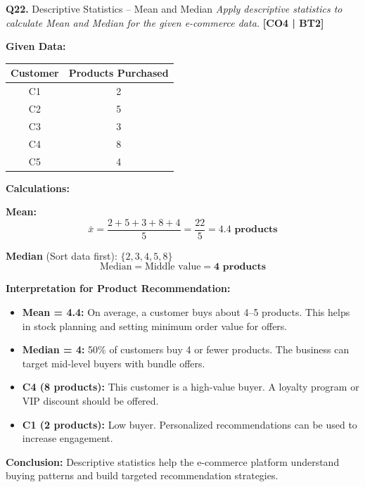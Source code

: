 \documentclass[12pt,a4paper]{article}
\newcommand{\Qno}[1]{\textbf{\color{darkred}Q#1.}}
\newcommand{\term}[1]{\textbf{\color{headingcolor}#1}}
\begin{document}
\vspace{8pt}

\begin{questionbox}{\Qno{22} Descriptive Statistics -- Mean and Median}
\textit{Apply descriptive statistics to calculate Mean and Median for the given e-commerce data.} \hfill \textbf{[CO4 | BT2]}
\end{questionbox}

\begin{answerenv}

\textbf{\color{headingcolor}Given Data:}
\begin{center}
\begin{tabular}{cc}
\toprule
\textbf{Customer} & \textbf{Products Purchased} \\
\midrule
C1 & 2 \\
C2 & 5 \\
C3 & 3 \\
C4 & 8 \\
C5 & 4 \\
\bottomrule
\end{tabular}
\end{center}

\textbf{\color{headingcolor}Calculations:}

\textbf{Mean:}
\[
\bar{x} = \frac{2 + 5 + 3 + 8 + 4}{5} = \frac{22}{5} = \mathbf{4.4 \text{ products}}
\]

\textbf{Median} (Sort data first): $\{2, 3, 4, 5, 8\}$
\[
\text{Median} = \text{Middle value} = \mathbf{4 \text{ products}}
\]

\textbf{\color{headingcolor}Interpretation for Product Recommendation:}
\begin{itemize}[leftmargin=1.5em, itemsep=3pt]
  \item \term{Mean = 4.4:} On average, a customer buys about 4--5 products. This helps in stock planning and setting minimum order value for offers.
  \item \term{Median = 4:} 50\% of customers buy 4 or fewer products. The business can target mid-level buyers with bundle offers.
  \item \term{C4 (8 products):} This customer is a high-value buyer. A loyalty program or VIP discount should be offered.
  \item \term{C1 (2 products):} Low buyer. Personalized recommendations can be used to increase engagement.
\end{itemize}

\begin{keypoint}
\textbf{Conclusion:} Descriptive statistics help the e-commerce platform understand buying patterns and build targeted recommendation strategies.
\end{keypoint}

\end{answerenv}
\end{document}
